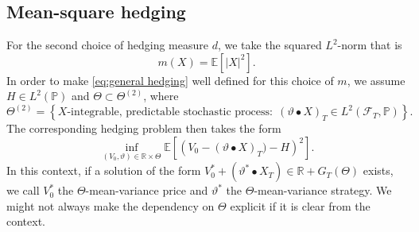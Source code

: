 \documentclass[11pt,a4paper,twoside,openany]{report}
\theoremstyle{plain} %
\theoremstyle{definition} %
\theoremstyle{remark} %
\begin{document}
\subsection{Mean-square hedging}\label{sec:high level discussion of mean-square hedging}
For the second choice of hedging measure \(d\), we take the squared \(L^2\)-norm that is 
\begin{equation}
    m(X)=\mathbb{E}[|X|^2].
\end{equation}
In order to make \cref{eq:general hedging} well defined for this choice of \(m\), we assume \(H\in L^2(\mathbb{P})\) and \(\Theta\subset\Theta^{(2)}\), where
\begin{equation}
    \Theta^{(2)}=\left\{X\text{-integrable, predictable stochastic process}:\;(\vartheta\bullet X)_T\in L^2(\mathcal{F}_T,\mathbb{P})\right\} .
\end{equation}
The corresponding hedging problem then takes the form 
\begin{equation}\label{eq:mean squared hedging}
\inf_{(V_0,\vartheta)\in\mathbb{R}\times \Theta}\mathbb{E}[\left(V_0-(\vartheta\bullet X)_T)-H\right)^2].
\end{equation}
In this context, if a solution of the form \(V_0^*+(\vartheta^*\bullet X_T)\in\mathbb{R}+ G_T(\Theta)\) exists, we call \(V_0^*\) the \(\Theta\)-mean-variance price and \(\vartheta^*\) the \(\Theta\)-mean-variance strategy. We might not always make the dependency on \(\Theta\) explicit if it is clear from the context.
\end{document}
